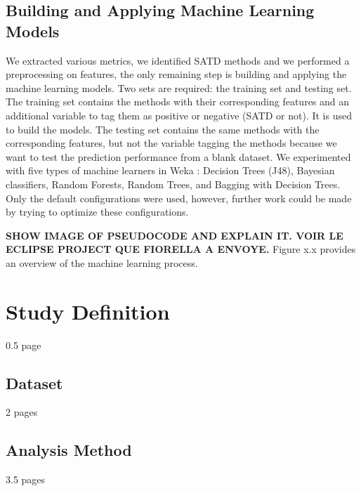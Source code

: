\subsection{Building and Applying Machine Learning Models}

 We extracted various metrics, we identified \ac{SATD} methods and we performed a preprocessing on features, the only remaining step is building and applying the machine learning models. Two sets are required: the training set and testing set. The training set contains the methods with their corresponding features and an additional variable to tag them as positive or negative (\ac{SATD} or not). It is used to build the models. The testing set contains the same methods with the corresponding features, but not the variable tagging the methods because we want to test the prediction performance from a blank dataset. We experimented with five types of machine learners in Weka \citep{hall2009weka}: Decision Trees (J48), Bayesian classifiers, Random Forests, Random Trees, and Bagging with Decision Trees. Only the default configurations were used, however, further work could be made by trying to optimize these configurations.
 
 \textbf{SHOW IMAGE OF PSEUDOCODE AND EXPLAIN IT. VOIR LE ECLIPSE PROJECT QUE FIORELLA A ENVOYE.} Figure x.x provides an overview of the machine learning process.
	
\section{Study Definition}

0.5 page

\subsection{Dataset}

2 pages

\subsection{Analysis Method}

3.5 pages